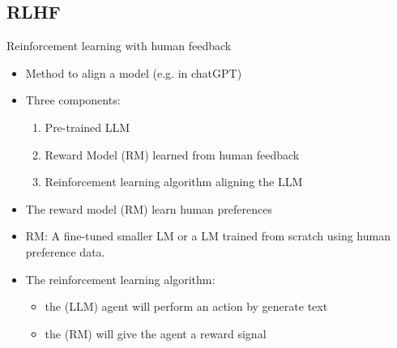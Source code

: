 \documentclass[10pt]{beamer}
\begin{document}
\subsection{RLHF}

\begin{frame}{Reinforcement learning with human feedback}

\begin{itemize}
\item Method to align a model (e.g. in chatGPT)
\item Three components:
\begin{enumerate}
\item Pre-trained LLM
\item Reward Model (RM) learned from human feedback
\item Reinforcement learning algorithm aligning the LLM
\end{enumerate}
\pause
\item {} The reward model (RM) learn human preferences
\item RM: A fine-tuned smaller LM or a LM trained from scratch using human preference data.
\pause
\item The reinforcement learning algorithm:
\begin{itemize}
\item the (LLM) agent  will perform an action by generate text
\item the (RM) will give the agent a reward signal
\end{itemize}
\end{itemize}




\end{frame}
\end{document}
